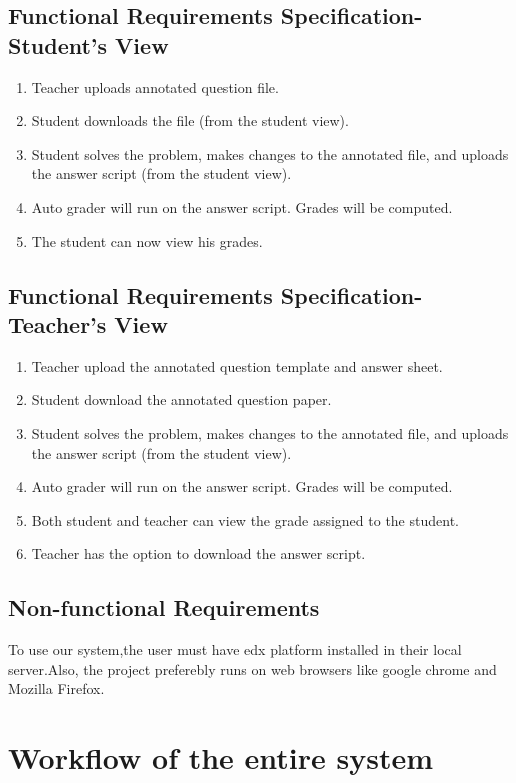 \documentclass{scrreprt}
\begin{document}
\section{Functional Requirements Specification-Student's View}

\begin{enumerate}
\item Teacher uploads annotated question file.
\item Student downloads the file (from the student view).
\item Student solves the problem, makes changes to the annotated file, and uploads the
answer script (from the student view).
\item Auto grader will run on the answer script. Grades will be computed.
\item The student can now view his grades.
\end{enumerate}

\section{Functional Requirements Specification-Teacher’s View}

\begin{enumerate}
\item Teacher upload the annotated question template and answer sheet.
\item Student download the annotated question paper.
\item Student solves the problem, makes changes to the annotated file, and uploads the
answer script (from the student view).
\item Auto grader will run on the answer script. Grades will be computed.
\item Both student and teacher can view the grade assigned to the student.
\item Teacher has the option to download the answer script.
\end{enumerate}

\section{Non-functional Requirements}

To use our system,the user must have edx platform installed in their local server.Also, the project 
preferebly runs on web browsers like google chrome and Mozilla Firefox. 

\chapter{Workflow of the entire system}
\end{document}
